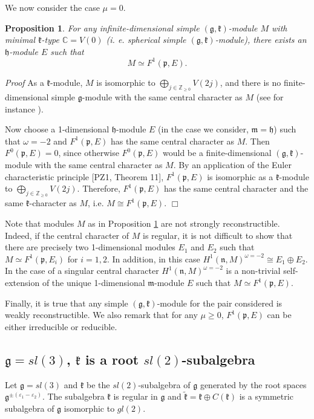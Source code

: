 \documentclass[11pt]{amsart}
\newcounter{theorem}
\newtheorem{prop}[theo]{Proposition}
\renewenvironment{proof}{ \emph{Proof}}{$\Box$}
\newcommand{\kk}{\mathfrak{k}}
\newcommand{\nn}{\mathfrak{n}}
\newcommand{\mm}{\mathfrak{m}}
\newcommand{\hh}{\mathfrak{h}}
\newcommand{\pp}{\mathfrak{p}}
\renewcommand{\gg}{\mathfrak{g}}
\newcommand{\refprop}[1]{Proposition \ref{#1}}
\newcommand{\field}[1]{\mathbb{#1}}
\begin{document}
We now consider the case $\mu=0$.
\begin{prop}\label{pr8.5}
For any infinite-dimensional simple $(\gg,\kk)$-module $M$ with minimal $\kk$-type $\field{C}=V(0)$ (i. e. spherical simple $(\gg,\kk)$-module), there exists an $\hh$-module $E$ such that $$M\simeq F^1(\pp,E).$$
\end{prop}
\begin{proof}
As a $\kk$-module, $M$ is isomorphic to $\bigoplus_{j\in \field{Z}_{\geq 0}}V(2j)$, and there is no finite-dimensional simple $\gg$-module with the same central character as $M$ (see for instance \cite{PS2}). 

Now choose a 1-dimensional $\hh$-module $E$ (in the case we consider, $\mm=\hh$) such that $\omega=-2$ and $F^1(\pp,E)$ has the same central character as $M$. Then $F^0(\pp,E)=0$, since otherwise $F^0(\pp,E)$ would be a finite-dimensional $(\gg,\kk)$-module with the same central character as $M$. By an application of the Euler characteristic principle [PZ1, Theorem 11], $F^1(\pp,E)$ is isomorphic as a $\kk$-module to $\bigoplus_{j\in \field{Z}_{\geq 0}}V(2j)$. Therefore, $F^1(\pp,E)$ has the same central character and the same $\kk$-character as $M$, i.e. $M\cong F^1(\pp,E)$.
\end{proof}

Note that modules $M$ as in \refprop{pr8.5} are not strongly reconstructible. Indeed, if the central character of $M$ is regular, it is not difficult to show that there are precisely two 1-dimensional modules $E_1$ and $E_2$ such that $M\simeq F^1(\pp,E_i)$ for $i=1,2$. In addition, in this case $H^1(\nn,M)^{\omega=-2}\cong E_1\oplus E_2$. In the case of a singular central character $H^1(\nn,M)^{\omega=-2}$ is a non-trivial self-extension of the unique 1-dimensional $\mm$-module $E$ such that $M\simeq F^1(\pp,E)$.

Finally, it is true that any simple $(\gg,\kk)$-module for the pair considered is weakly reconstructible. We also remark that for any $\mu\geq 0$, $F^1(\pp,E)$ can be either irreducible or reducible.

\subsection{$\gg=sl(3)$, $\kk$ is a root $sl(2)$-subalgebra} %

Let $\gg=sl(3)$ and $\kk$ be the $sl(2)$-subalgebra of $\gg$ generated by the root spaces $\gg^{\pm(\varepsilon_1-\varepsilon_2)}$. The subalgebra $\kk$ is regular in $\gg$ and $\tilde{\kk}=\kk\oplus C(\kk)$ is a symmetric subalgebra of $\gg$ isomorphic to $gl(2)$.
\end{document}
